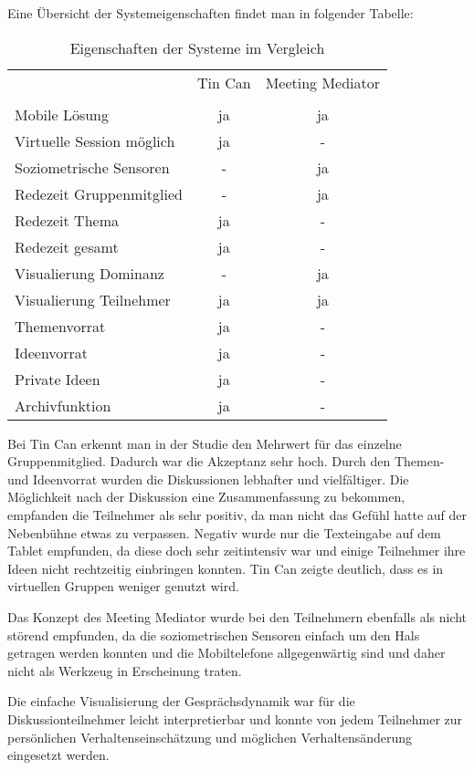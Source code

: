 \documentclass{seminarvorlage}
\begin{document}
Eine Übersicht der Systemeigenschaften findet man in folgender Tabelle:

\begin{table}[h]
\begin{tabular}{ l | c | c }
   & Tin Can & Meeting Mediator \\
   & \\
  \hline
  Mobile Lösung & ja & ja \\
  Virtuelle Session möglich & ja & - \\
  Soziometrische Sensoren & - & ja \\
  \hline
  Redezeit Gruppenmitglied & - & ja \\
  Redezeit Thema  & ja & - \\
  Redezeit gesamt & ja & - \\
  \hline
  
  Visualierung Dominanz & - & ja \\
  Visualierung Teilnehmer & ja & ja \\
  \hline
  Themenvorrat & ja & - \\
  Ideenvorrat & ja & - \\
  Private Ideen & ja & - \\
  Archivfunktion & ja & - \\
  

\end{tabular}
\caption{Eigenschaften der Systeme im Vergleich}
\end{table}

Bei Tin Can erkennt man in der Studie den Mehrwert für das einzelne
Gruppenmitglied. Dadurch war die Akzeptanz sehr hoch. Durch den Themen- und
Ideenvorrat wurden die Diskussionen lebhafter und vielfältiger. Die
Mög\-lich\-keit nach der Diskussion eine Zusammenfassung zu bekommen, empfanden
die Teilnehmer als sehr positiv, da man nicht das Gefühl hatte auf der
Nebenbühne etwas zu verpassen. Negativ wurde nur die Texteingabe auf dem Tablet
empfunden, da diese doch sehr zeitintensiv war und einige Teilnehmer ihre Ideen
nicht rechtzeitig einbringen konnten.
Tin Can zeigte deutlich, dass es in virtuellen Gruppen weniger genutzt
wird.

Das Konzept des Meeting Mediator wurde bei den Teilnehmern ebenfalls als nicht
störend empfunden, da die soziometrischen Sensoren einfach um den Hals getragen
werden konnten und die Mobiltelefone allgegenwärtig sind und daher nicht als
Werkzeug in Erscheinung traten.

Die einfache Visualisierung der Gesprächsdynamik war für die
Diskussionteilnehmer leicht interpretierbar und konnte von jedem Teilnehmer zur
per\-sön\-lich\-en Ver\-haltens\-ein\-schätz\-ung und möglichen
Verhaltensänderung eingesetzt werden.
\end{document}
